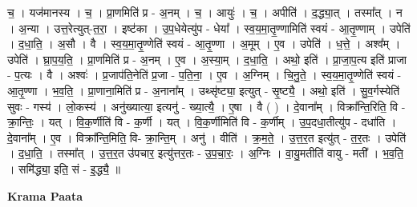 \documentclass[17pt]{extarticle}
\begin{document}
च॒ । यज॑मानस्य । च॒ । प्रा॒णमिति॑ प्र - अ॒नम् । च॒ । आयुः॑ । च॒ । अपीति॑ । द॒द्ध्या॒त् । तस्मा᳚त् । न । अ॒न्या । उत्त॒रेत्युत्-त॒रा॒ । इष्ट॑का । उ॒प॒धेयेत्यु॑प - धेया᳚ । स्व॒य॒मा॒तृ॒ण्णामिति॑ स्वयं - आ॒तृ॒ण्णाम् । उपेति॑ । द॒धा॒ति॒ । अ॒सौ । वै । स्व॒य॒मा॒तृ॒ण्णेति॑ स्वयं - आ॒तृ॒ण्णा । अ॒मूम् । ए॒व । उपेति॑ । ध॒त्ते॒ । अश्व᳚म् । उपेति॑ । घ्रा॒प॒य॒ति॒ । प्रा॒णमिति॑ प्र - अ॒नम् । ए॒व । अ॒स्या॒म् । द॒धा॒ति॒ । अथो॒ इति॑ । प्रा॒जा॒प॒त्य इति॑ प्राजा - प॒त्यः । वै । अश्वः॑ । प्र॒जाप॑ति॒नेति॑ प्र॒जा - प॒ति॒ना॒ । ए॒व । अ॒ग्निम् । चि॒नु॒ते॒ । स्व॒य॒मा॒तृ॒ण्णेति॑ स्वयं - आ॒तृ॒ण्णा । भ॒व॒ति॒ । प्रा॒णाना॒मिति॑ प्र - अ॒नाना᳚म् । उथ्सृ॑ष्ट्या॒ इत्युत् - सृ॒ष्ट्यै॒ । अथो॒ इति॑ । सु॒व॒र्गस्येति॑ सुवः - गस्य॑ । लो॒कस्य॑ । अनु॑ख्यात्या॒ इत्यनु॑ - ख्या॒त्यै॒ । ए॒षा । वै ( ) । दे॒वाना᳚म् । विक्रा᳚न्ति॒रिति॒ वि - क्रा॒न्तिः॒ । यत् । वि॒क॒र्णीति॑ वि - क॒र्णी । यत् । वि॒क॒र्णीमिति॑ वि - क॒र्णीम् । उ॒प॒दधा॒तीत्यु॑प - दधा॑ति । दे॒वाना᳚म् । ए॒व । विक्रा᳚न्ति॒मिति॒ वि- क्रा॒न्ति॒म् । अनु॑ । वीति॑ । क्र॒म॒ते॒ । उ॒त्त॒र॒त इत्यु॑त् - त॒र॒तः । उपेति॑ । द॒धा॒ति॒ । तस्मा᳚त् । उ॒त्त॒र॒त उ॑पचार॒ इत्यु॑त्तर॒तः - उ॒प॒चा॒रः॒ । अ॒ग्निः । वा॒यु॒मतीति॑ वायु - मती᳚ । भ॒व॒ति॒ । समि॑द्ध्या॒ इति॒ सं - इ॒द्ध्यै॒ ॥  \newline


\textbf{Krama Paata} \newline
\end{document}

